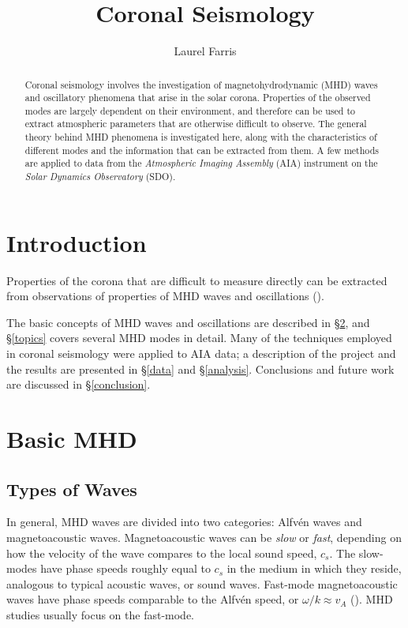 \documentclass[preprint2]{aastex}
\begin{document}
\title{\vspace{-0.75in}Coronal Seismology}
\author{\vspace{-0.25in}Laurel Farris}

\begin{abstract}
Coronal seismology involves the investigation of magnetohydrodynamic
(MHD) waves and oscillatory phenomena that arise in the solar corona.
Properties of the observed modes are largely dependent on their
environment, and therefore can be used to extract atmospheric
parameters that are otherwise difficult to observe.
The general theory behind MHD phenomena is investigated here, along with
the characteristics of different modes
and the information that can be extracted from them.
A few methods are applied to data from the \emph{Atmospheric Imaging
Assembly} (AIA) instrument on the \emph{Solar Dynamics Observatory} (SDO).
\end{abstract}

\section{Introduction}\label{intro}
Properties of the corona that are difficult to measure directly
can be extracted from observations of properties of MHD waves and
oscillations (\cite{tor_2}).

The basic concepts of MHD waves and oscillations are described in
\S\ref{MHD}, and
\S\ref{topics} covers several MHD modes in detail.
Many of the techniques employed in coronal seismology were applied to AIA
data; a description of the project and the results are presented in
\S\ref{data} and \S\ref{analysis}.
Conclusions and future work are discussed in
\S\ref{conclusion}.
\section{Basic MHD}\label{MHD}
\subsection{Types of Waves}
In general, MHD waves are divided into two categories:
Alfv\'en waves and magnetoacoustic waves.
Magnetoacoustic waves can be \emph{slow} or \emph{fast}, depending on
how the velocity of the wave compares to the local sound speed,
$c_{s}$.
The slow-modes have phase speeds roughly equal to $c_{s}$
in the medium in which they reside, analogous to typical acoustic waves,
or sound waves.
Fast-mode magnetoacoustic waves have phase speeds comparable to the Alfv\'en
speed, or $\omega/k \approx v_A$ (\cite{kink_1}).
MHD studies usually focus on the fast-mode.
\end{document}
